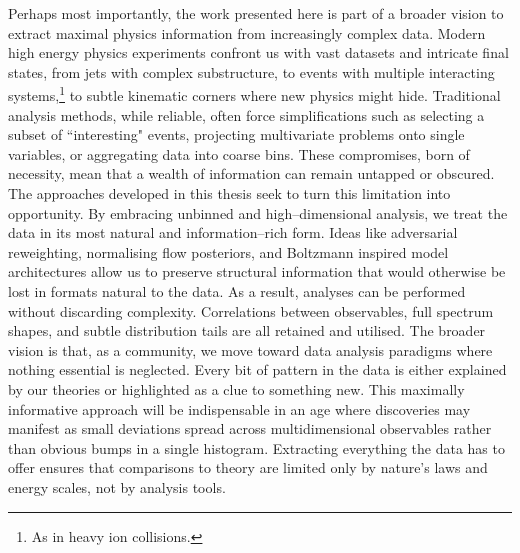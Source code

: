     Perhaps most importantly, the work presented here is part of a broader vision to extract {maximal physics information} from increasingly complex data.
    Modern high energy physics experiments confront us with vast datasets and intricate final states, from jets with complex substructure, to events with multiple interacting systems,\footnote{As in heavy ion collisions.} to subtle kinematic corners where new physics might hide.
    Traditional analysis methods, while reliable, often force simplifications such as selecting a subset of ``interesting" events, projecting multivariate problems onto single variables, or aggregating data into coarse bins.
    These compromises, born of necessity, mean that a wealth of information can remain untapped or obscured.
    The approaches developed in this thesis seek to turn this limitation into opportunity.
    By embracing unbinned and high--dimensional analysis, we treat the data in its most natural and information--rich form.
    Ideas like adversarial reweighting, normalising flow posteriors, and Boltzmann inspired model architectures allow us to preserve structural information that would otherwise be lost in formats natural to the data.
    As a result, analyses can be performed without discarding complexity.
    Correlations between observables, full spectrum shapes, and subtle distribution tails are all retained and utilised.
    The broader vision is that, as a community, we move toward data analysis paradigms where nothing essential is neglected.
    Every bit of pattern in the data is either explained by our theories or highlighted as a clue to something new.
    This maximally informative approach will be indispensable in an age where discoveries may manifest as small deviations spread across multidimensional observables rather than obvious bumps in a single histogram.
    Extracting everything the data has to offer ensures that comparisons to theory are limited only by nature's laws and energy scales, not by analysis tools.
                
